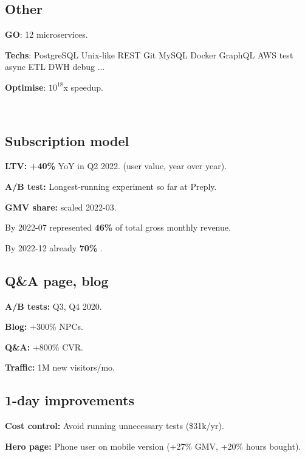 \documentclass[a4paper]{MagicalCV}
\begin{document}
\begin{minipage}[t]{0.33\textwidth}
\subsection{Other}
\begin{tightemize}
\item {\bf GO}: 12 microservices.
\item {\bf Techs}: PostgreSQL \textbullet{} Unix-like \textbullet{} REST \textbullet{} Git \textbullet{} MySQL \textbullet{} Docker \textbullet{}
 GraphQL \textbullet{} AWS \textbullet{} test \textbullet{} async \textbullet{} ETL \textbullet{} DWH \textbullet{} debug \textbullet{} ...
\item {\bf Optimise}: $10^{18}$x speedup.
\end{tightemize}

 \\
\subsection{Subscription model}
\begin{tightemize}
\item {\bf LTV: } {\bf +40\% } YoY in Q2 2022. (user value, year over year).
\item {\bf A/B test: } Longest-running experiment so far at Preply.
\item {\bf GMV share: } scaled 2022-03.
  \item By 2022-07 represented {\bf 46\%} of total gross monthly revenue.
  \item By 2022-12 already {\bf 70\% }.

\end{tightemize}
\sectionsep

\subsection{Q\&A page, blog}
\begin{tightemize}
\item {\bf A/B tests: } Q3, Q4 2020.
\item {\bf Blog: } +300\% NPCs.
\item {\bf Q\&A: } +800\% CVR.
\item {\bf Traffic: } 1M new visitors/mo.
\end{tightemize}
\sectionsep


\subsection{1-day improvements}
\begin{tightemize}
\item {\bf Cost control: } Avoid running unnecessary tests (\$31k/yr).
\item {\bf Hero page: } Phone user on mobile version (+27\% GMV, +20\% hours bought).

\end{tightemize}
\sectionsep


\end{minipage}
\end{document}
